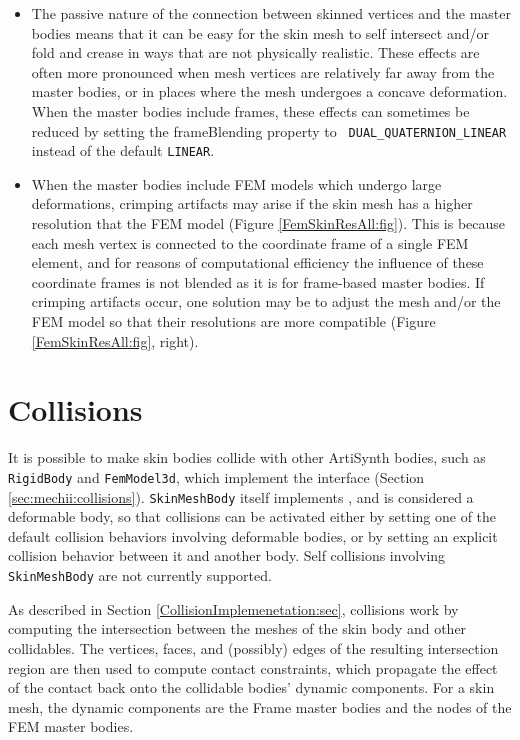 \begin{itemize}

\item The passive nature of the connection between skinned vertices
and the master bodies means that it can be easy for the skin mesh
to self intersect and/or fold and crease in ways that are not
physically realistic. These effects are often more pronounced when
mesh vertices are relatively far away from the master bodies, or in
places where the mesh undergoes a concave deformation. When the master
bodies include frames, these effects can sometimes be reduced by
setting the {\sf frameBlending} property to {\tt
DUAL\_QUATERNION\_LINEAR} instead of the default {\tt LINEAR}.

\item When the master bodies include FEM models which undergo large
deformations, crimping artifacts may arise if the skin mesh has a
higher resolution that the FEM model (Figure
\ref{FemSkinResAll:fig}). This is because each mesh vertex is
connected to the coordinate frame of a single FEM element, and for
reasons of computational efficiency the influence of these coordinate
frames is not blended as it is for frame-based master bodies.  If
crimping artifacts occur, one solution may be to adjust the mesh
and/or the FEM model so that their resolutions are more compatible
(Figure \ref{FemSkinResAll:fig}, right).

\end{itemize}

\section{Collisions}

It is possible to make skin bodies collide with other ArtiSynth
bodies, such as {\tt RigidBody} and {\tt FemModel3d}, which implement
the  interface
(Section \ref{sec:mechii:collisions}). {\tt SkinMeshBody} itself
implements , and
is considered a deformable body, so that collisions can be activated
either by setting one of the default collision behaviors involving
deformable bodies, or by setting an explicit collision behavior
between it and another body. Self collisions involving {\tt
SkinMeshBody} are not currently supported.

As described in Section \ref{CollisionImplemenetation:sec}, collisions
work by computing the intersection between the meshes of the skin body
and other collidables. The vertices, faces, and (possibly) edges of
the resulting intersection region are then used to compute contact
constraints, which propagate the effect of the contact back onto the
collidable bodies' dynamic components. For a skin mesh, the dynamic
components are the Frame master bodies and the nodes of the FEM master
bodies.


